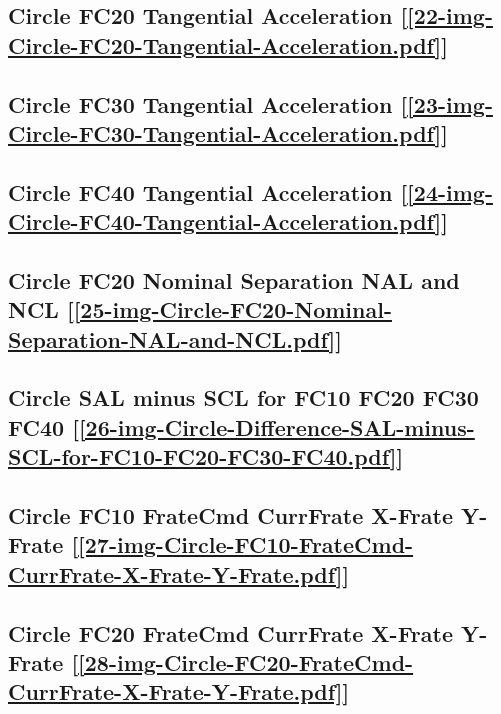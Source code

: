\subsection       {Circle FC20 Tangential Acceleration
[\ref      {22-img-Circle-FC20-Tangential-Acceleration.pdf}] }
\label{ssec-22-img-Circle-FC20-Tangential-Acceleration.pdf}

\subsection       {Circle FC30 Tangential Acceleration
[\ref      {23-img-Circle-FC30-Tangential-Acceleration.pdf}] }
\label{ssec-23-img-Circle-FC30-Tangential-Acceleration.pdf}

\subsection       {Circle FC40 Tangential Acceleration
[\ref      {24-img-Circle-FC40-Tangential-Acceleration.pdf}] }
\label{ssec-24-img-Circle-FC40-Tangential-Acceleration.pdf}

\subsection       {Circle FC20 Nominal Separation NAL and NCL
[\ref      {25-img-Circle-FC20-Nominal-Separation-NAL-and-NCL.pdf}] }
\label{ssec-25-img-Circle-FC20-Nominal-Separation-NAL-and-NCL.pdf}

\subsection       {Circle SAL minus SCL for FC10 FC20 FC30 FC40
[\ref      {26-img-Circle-Difference-SAL-minus-SCL-for-FC10-FC20-FC30-FC40.pdf}] }
\label{ssec-26-img-Circle-Difference-SAL-minus-SCL-for-FC10-FC20-FC30-FC40.pdf}


\subsection       {Circle FC10 FrateCmd CurrFrate X-Frate Y-Frate
[\ref      {27-img-Circle-FC10-FrateCmd-CurrFrate-X-Frate-Y-Frate.pdf}] }
\label{ssec-27-img-Circle-FC10-FrateCmd-CurrFrate-X-Frate-Y-Frate.pdf}

\subsection       {Circle FC20 FrateCmd CurrFrate X-Frate Y-Frate
[\ref      {28-img-Circle-FC20-FrateCmd-CurrFrate-X-Frate-Y-Frate.pdf}] }
\label{ssec-28-img-Circle-FC20-FrateCmd-CurrFrate-X-Frate-Y-Frate.pdf}

